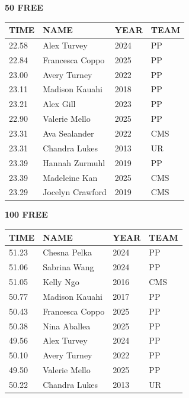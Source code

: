 \begin{table}[H]
\centering
\begin{minipage}[t]{0.48\textwidth}
\centering
\textbf{50 FREE}\\[0.1cm]
\begin{tabular}{@{}p{1.8cm}p{2.8cm}p{1.2cm}p{1.4cm}@{}}
\hline
    \textbf{TIME} & \textbf{NAME} & \textbf{YEAR} & \textbf{TEAM} \\
\hline
    22.58 & Alex Turvey & 2024 & PP \\
    22.84 & Francesca Coppo & 2025 & PP \\
    23.00 & Avery Turney & 2022 & PP \\
    23.11 & Madison Kauahi & 2018 & PP \\
    23.21 & Alex Gill & 2023 & PP \\
    22.90 & Valerie Mello & 2025 & PP \\
    23.31 & Ava Sealander & 2022 & CMS \\
    23.31 & Chandra Lukes & 2013 & UR \\
    23.39 & Hannah Zurmuhl & 2019 & PP \\
    23.39 & Madeleine Kan & 2025 & CMS \\
    23.29 & Jocelyn Crawford & 2019 & CMS \\
\hline
\end{tabular}
\end{minipage}\hfill
\begin{minipage}[t]{0.48\textwidth}
\centering
\textbf{100 FREE}\\[0.1cm]
\begin{tabular}{@{}p{1.8cm}p{2.8cm}p{1.2cm}p{1.4cm}@{}}
\hline
    \textbf{TIME} & \textbf{NAME} & \textbf{YEAR} & \textbf{TEAM} \\
\hline
    51.23 & Chesna Pelka & 2024 & PP \\
    51.06 & Sabrina Wang & 2024 & PP \\
    51.05 & Kelly Ngo & 2016 & CMS \\
    50.77 & Madison Kauahi & 2017 & PP \\
    50.43 & Francesca Coppo & 2025 & PP \\
    50.38 & Nina Aballea & 2025 & PP \\
    49.56 & Alex Turvey & 2024 & PP \\
    50.10 & Avery Turney & 2022 & PP \\
    49.50 & Valerie Mello & 2025 & PP \\
    50.22 & Chandra Lukes & 2013 & UR \\
\hline
\end{tabular}
\end{minipage}
\end{table}

